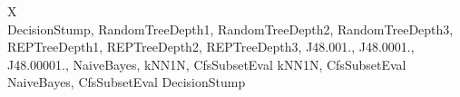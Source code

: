 \begin{table}[h]
\begin{tabularx}{\textwidth}{X}
	 \\ \hline
	DecisionStump, RandomTreeDepth1, RandomTreeDepth2, RandomTreeDepth3, REPTreeDepth1, REPTreeDepth2, REPTreeDepth3, J48.001., J48.0001., J48.00001., NaiveBayes, kNN1N, CfsSubsetEval kNN1N, CfsSubsetEval NaiveBayes, CfsSubsetEval DecisionStump \\ 
	\end{tabularx}
	\label{tab:metaFeatureDetails}
	\caption{The meta features computed by each meta feature group. More details can be found on \href{www.openml.org}{www.openml.org}.}
\end{table}

